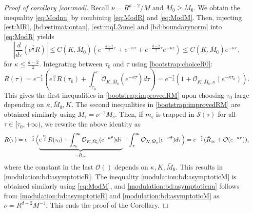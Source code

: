 \documentclass[11pt]{aims}
\theoremstyle{definition}
\newcommand{\Sc}{\mathcal{S}}
\newcommand{\Oc}{\mathcal{O}}
\newcommand{\be}{\begin{equation}}
\newcommand{\ee}{\end{equation}}
\numberwithin{equation}{section}
\begin{document}
\begin{proof}[Proof of corollary  \ref{cor:mod}]

Recall $\nu=R^{d-2}/M$ and $M_0\geq \bar M_0$. We obtain the inequality \eqref{eq:Modnu} by combining \eqref{eq:ModR} and \eqref{eq:ModM}. Then, injecting \eqref{est:MR}, \eqref{bd:estimationtau}, \eqref{est:mqL2ome} and \eqref{bd:boundarynorm} into \eqref{eq:ModR} yields
\be
|\frac{d}{d\tau} (e^{\frac \tau 2}R)|\leq C(K,\bar M_0) (e^{-\frac{d-2}{2}\tau}+e^{-\kappa \tau}+e^{-\frac{d-2}{2}\tau}e^{-\kappa \tau}) \leq C(K,\bar M_0)  e^{- \kappa \tau},
\ee
for $\kappa\leq \frac{d-2}{2}$. Integrating between $\tau_0$ and $\tau$ using \eqref{bootstrap:choiceR0}:
$$
R(\tau)=e^{-\frac \tau 2}\left(e^{\frac{\tau_0}{2}}R(\tau_0)+\int_{\tau_0}^\tau \Oc_{K,\bar M_0}(e^{-\kappa \tilde \tau})d\tilde \tau\right)=e^{-\frac{\tau}{2}}(1+\Oc_{K,\bar M_0,\kappa}(e^{- \kappa \tau_0})).
$$
This gives the first inequalities in \eqref{bootstrap:improvedRM} upon choosing $\tau_0$ large depending on $\kappa,\bar M_0,K$. The second inequalities in \eqref{bootstrap:improvedRM} are obtained similarly using $M_\tau=\nu^{-1}M_s$. Then, if $m_q$ is trapped in $\Sc(\tau)$ for all $\tau \in [\tau_0, +\infty)$, we rewrite the above identity as
$$
R(\tau)=e^{-\frac \tau 2}\Bigl(\underbrace{e^{\frac{\tau_0}{2}}R(\tau_0)+\int_{\tau_0}^\infty \Oc_{K,\bar M_0}(e^{-\kappa \tilde \tau})d\tilde \tau}_{=\tilde R_\infty} -\int_\tau^\infty \Oc_{K,\bar M_0}(e^{-\kappa \tilde \tau})d \tilde \tau \Bigr)=e^{-\frac{\tau}{2}}(\tilde R_\infty+\Oc(e^{-\kappa \tau})),
$$
where the constant in the last $\Oc()$ depends on $\kappa,K,\bar M_0$. This results in \eqref{modulation:bd:asymptoticR}. The inequality \eqref{modulation:bd:asymptoticM} is obtained similarly using \eqref{eq:ModM}, and \eqref{modulation:bd:asymptoticnu}  follows from \eqref{modulation:bd:asymptoticR} and \eqref{modulation:bd:asymptoticM} as $\nu=R^{d-2}M^{-1}$. This ends the proof of the Corollary.
\end{proof}
\end{document}
